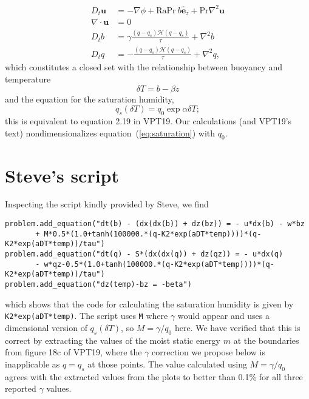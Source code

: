 \documentclass[11pt]{article}
\begin{document}
\begin{align}
  \label{eq:NS}
  D_t \mathbf{u} &= -\nabla \phi + \mathrm{Ra} \mathrm{Pr}\ b \hat{\mathbf{e}}_z + \mathrm{Pr} \nabla^2 \mathbf{u}\\
  \nabla \cdot \mathbf{u} &= 0\\
  \label{eq:buoyancy}
  D_t b &= \gamma \frac{(q-q_s) \mathcal{H}(q-q_s)}{\tau} + \nabla^2 b\\
  \label{eq:moisture}
  D_t q &= -\frac{(q-q_s) \mathcal{H}(q-q_s)}{\tau} + \nabla^2 q,
\end{align}
which constitutes a closed set with the relationship between buoyancy and temperature
\begin{equation}
  \label{eq:b_temp}
  \delta T = b - \beta z
\end{equation}
and the equation for the saturation humidity,
\begin{equation}
  \label{eq:saturation}
  q_s(\delta T) = q_0 \exp{\alpha \delta T};
\end{equation}
this is equivalent to equation 2.19 in VPT19. Our calculations (and VPT19's text) nondimensionalizes equation~(\ref{eq:saturation}) with $q_0$.

\section{Steve's script}
\label{sec:steve}
Inspecting the script kindly provided by Steve, we find 
\begin{verbatim}
problem.add_equation("dt(b) - (dx(dx(b)) + dz(bz)) = - u*dx(b) - w*bz 
       + M*0.5*(1.0+tanh(100000.*(q-K2*exp(aDT*temp))))*(q-K2*exp(aDT*temp))/tau")
problem.add_equation("dt(q) - S*(dx(dx(q)) + dz(qz)) = - u*dx(q) 
       - w*qz-0.5*(1.0+tanh(100000.*(q-K2*exp(aDT*temp))))*(q-K2*exp(aDT*temp))/tau")
problem.add_equation("dz(temp)-bz = -beta")
\end{verbatim}
which shows that the code for calculating the saturation humidity is given by \texttt{K2*exp(aDT*temp)}. The script uses \texttt{M} where $\gamma$ would appear and uses a dimensional version of $q_s(\delta T)$, so $M = \gamma/q_0$ here. We have verified that this is correct by extracting the values of the moist static energy $m$ at the boundaries from figure 18c of VPT19, where the $\gamma$ correction we propose below is inapplicable as $q = q_s$ at those points. The value calculated using $M=\gamma/q_0$ agrees with the extracted values from the plots to better than 0.1\% for all three reported $\gamma$ values.
\end{document}
